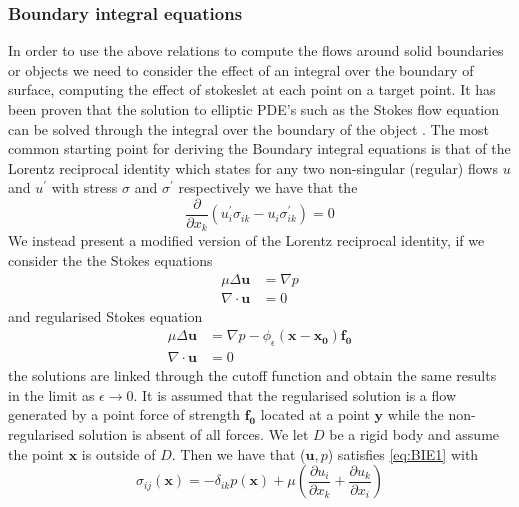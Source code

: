 \subsubsection{Boundary integral equations}
In order to use the above relations to compute the flows around solid boundaries or objects we need to consider the effect of an integral over the boundary of surface, computing the effect of stokeslet at each point on a target point. It has been proven that the solution to elliptic PDE's such as the Stokes flow equation can be solved through the integral over the boundary of the object \cite{Stakgold1968Boundary2,Pozrikidis1992BoundaryFlow}. The most common starting point for deriving the Boundary integral equations is that of the Lorentz reciprocal identity which states for any two non-singular (regular) flows $u$ and $u^\prime$ with stress $\sigma$ and $\sigma^\prime$ respectively we have that the 
\begin{equation*}
    \frac{\partial}{\partial x_k}(u_i^\prime\sigma_{ik} - u_i \sigma^\prime_{ik}) = 0
\end{equation*}
We instead present a modified version of the Lorentz reciprocal identity, if we consider the the Stokes equations
\begin{equation}
    \label{eq:BIE1}
\begin{aligned}
      \mu\Delta\boldsymbol{u} &= \nabla p \\
      \nabla \cdot \boldsymbol{u} &= 0
\end{aligned}
\end{equation}
and regularised Stokes equation
\begin{equation}
    \label{eq:BIE2}
\begin{aligned}
      \mu\Delta\boldsymbol{u} &= \nabla p - \phi_{\epsilon}(\bm{x}-\bm{x_0})\bm{f_0} \\
      \nabla \cdot \boldsymbol{u} &= 0
\end{aligned}
\end{equation}
the solutions are linked through the cutoff function and obtain the same results in the limit as $\epsilon \to 0$. It is assumed that the regularised solution is a flow generated by a point force of strength $\bm{f_0}$ located at a point $\bm{y}$ while the non-regularised solution is absent of all forces. We let $D$ be a rigid body and assume the point $\bm{x}$ is outside of $D$. Then we have that ($\bm{u},p$) satisfies \cref{eq:BIE1} with
\begin{equation*}
\sigma_{ij}(\bm{x}) = -\delta_{ik}p(\bm{x}) + \mu\left( \frac{\partial u_i}{\partial x_k} + \frac{\partial u_k}{\partial x_i} \right)
\end{equation*}
